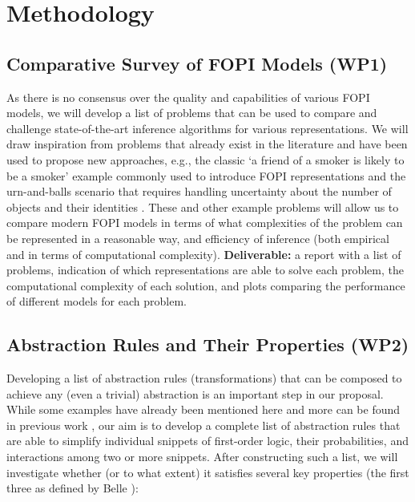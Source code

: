 \documentclass[11pt,english,twocolumn]{article}
\begin{document}
\section{Methodology} %

\subsection*{Comparative Survey of FOPI Models (WP1)}

As there is no consensus over the quality and capabilities of various
FOPI models, we will develop a list of problems that can be used to compare and
challenge state-of-the-art inference algorithms for various representations. We
will draw inspiration from problems that already exist in the literature and
have been used to propose new approaches, e.g., the classic `a friend of a
smoker is likely to be a smoker' example commonly used to introduce FOPI
representations
\cite{DBLP:series/sci/BrazAR08,DBLP:conf/ijcai/BroeckTMDR11,DBLP:journals/ml/RichardsonD06,DBLP:journals/cib/Venugopal17}
and the urn-and-balls scenario that requires handling uncertainty about the
number of objects and their identities \cite{DBLP:conf/ijcai/MilchMRSOK05}.
These and other example problems will allow us to compare modern FOPI models
in terms of what complexities of the problem can be represented in a reasonable
way, and efficiency of inference (both empirical and in terms of computational
complexity). \textbf{Deliverable:} a report with a list of problems, indication of
which representations are able to solve each problem, the computational
complexity of each solution, and plots comparing the performance of different
models for each problem.

\subsection*{Abstraction Rules and Their Properties (WP2)}

Developing a list of abstraction rules (transformations) that can be composed to
achieve any (even a trivial) abstraction is an important step in our proposal.
While some examples have already been mentioned here and more can be found in
previous work
\cite{DBLP:journals/corr/abs-1810-02434,DBLP:journals/ai/GiunchigliaW92,DBLP:conf/uai/HoltzenMB17,saitta2013abstraction},
our aim is to develop a complete list of abstraction rules that are able to
simplify individual snippets of first-order logic, their probabilities, and
interactions among two or more snippets. After constructing such a list, we will
investigate whether (or to what extent) it satisfies several key properties (the
first three as defined by Belle \cite{DBLP:journals/corr/abs-1810-02434}):
\end{document}
